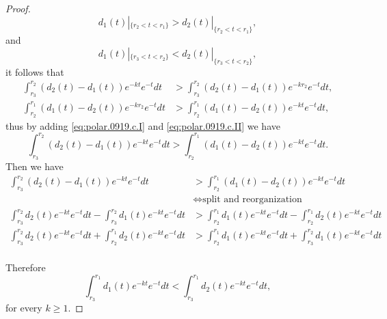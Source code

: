 \documentclass[twoside,openany,12pt]{beautynote}
\begin{document}
\begin{proof}
$$d_{1}(t)|_{\{r_{2}<t<r_{1}\}}>d_{2}(t)|_{\{r_{2}<t<r_{1}\}},$$
and
$$d_{1}(t)|_{\{r_{3}<t<r_{2}\}}<d_{2}(t)|_{\{r_{3}<t<r_{2}\}},$$
it follows that
  \begin{align}
  \int_{r_{3}}^{r_{2}}(d_{2}(t)-d_{1}(t))e^{-kt}e^{-t}dt
  &>\int_{r_{3}}^{r_{2}}(d_{2}(t)-d_{1}(t))e^{-kr_{2}}e^{-t}dt,\label{eq:polar.0919.c.I}
  \\
  \int_{r_{2}}^{r_{1}}(d_{1}(t)-d_{2}(t))e^{-kr_{2}}e^{-t}dt
  &>\int_{r_{2}}^{r_{1}}(d_{1}(t)-d_{2}(t))e^{-kt}e^{-t}dt, \label{eq:polar.0919.c.II}
  \end{align}
  thus by adding \eqref{eq:polar.0919.c.I} and \eqref{eq:polar.0919.c.II}
 we have   
 \[
  \int_{r_{3}}^{r_{2}}(d_{2}(t)-d_{1}(t))e^{-kt}e^{-t}dt>\int_{r_{2}}^{r_{1}}(d_{1}(t)-d_{2}(t))e^{-kt}e^{-t}dt.
 \]
Then we have
\begin{align*}
  \int_{r_{3}}^{r_{2}}(d_{2}(t)-d_{1}(t))e^{-kt}e^{-t}dt&>\int_{r_{2}}^{r_{1}}(d_{1}(t)-d_{2}(t))e^{-kt}e^{-t}dt\\ 
&\iff \text{split and reorganization}\\ 
\int_{r_{3}}^{r_{2}}d_{2}(t)e^{-kt}e^{-t}dt -\int_{r_{3}}^{r_{2}}d_{1}(t)e^{-kt}e^{-t}dt&>\int_{r_{2}}^{r_{1}}d_{1}(t)e^{-kt}e^{-t}dt -\int_{r_{2}}^{r_{1}}d_{2}(t)e^{-kt}e^{-t}dt\\ 
\int_{r_{3}}^{r_{2}}d_{2}(t)e^{-kt}e^{-t}dt +\int_{r_{2}}^{r_{1}}d_{2}(t)e^{-kt}e^{-t}dt&>\int_{r_{2}}^{r_{1}}d_{1}(t)e^{-kt}e^{-t}dt +\int_{r_{3}}^{r_{2}}d_{1}(t)e^{-kt}e^{-t}dt\\ 
\end{align*}

 Therefore 
  $$\int_{r_{3}}^{r_{1}}d_{1}(t)e^{-kt}e^{-t}dt<\int_{r_{3}}^{r_{1}}d_{2}(t)e^{-kt}e^{-t}dt,$$
  for every $k\geq1$.



\end{proof}
\end{document}

